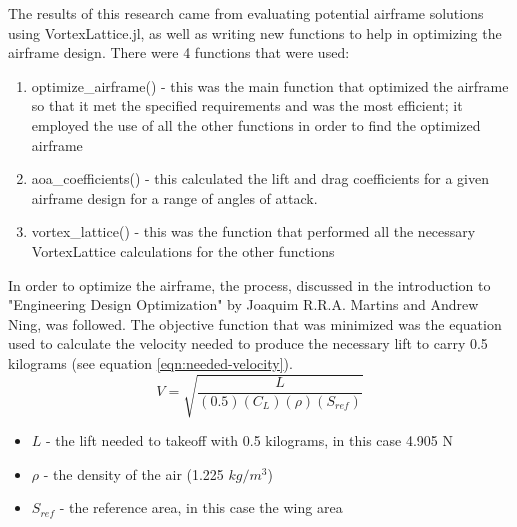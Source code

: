 \documentclass{journal}
\begin{document}
	The results of this research came from evaluating potential airframe solutions using VortexLattice.jl, as well as writing new functions to help in optimizing the airframe design. There were 4 functions that were  used:\\
	
	\begin{enumerate}
		\item optimize\_airframe() - this was the main function that optimized the airframe so that it met the specified requirements and was the most efficient; it employed the use of all the other functions in order to find the optimized airframe
		\item aoa\_coefficients() - this calculated the lift and drag coefficients for a given airframe design for a range of angles of attack.
		\item vortex\_lattice() - this was the function that performed all the necessary VortexLattice calculations for the other functions 
	\end{enumerate}
	
	In order to optimize the airframe, the process, discussed in the introduction to "Engineering Design Optimization" by Joaquim R.R.A. Martins and Andrew Ning, was followed. The objective function  that was minimized was the equation used to calculate the velocity needed to produce the necessary lift to carry 0.5 kilograms (see equation \ref{eqn:needed-velocity}).\\
	
	\begin{equation}
		V = \sqrt{\frac{L}{(0.5)(C_L)(\rho)(S_{ref})}}
		\label{eqn:needed-velocity}
	\end{equation}
	
	\begin{itemize}
		\item \(L\) - the lift needed to takeoff with 0.5 kilograms, in this case 4.905 N
		\item \(\rho\) - the density of the air (1.225 \(kg/m^3\))
		\item \(S_{ref}\) - the reference area, in this case the wing area
	\end{itemize}
	
\end{document}
